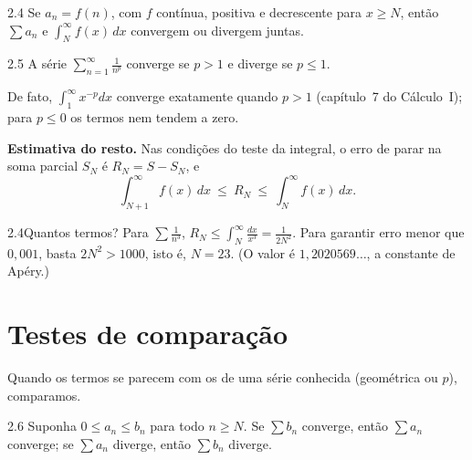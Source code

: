 \begin{teorema}{2.4}
Se $a_n=f(n)$, com $f$ contínua, positiva e decrescente para
$x\ge N$, então $\sum a_n$ e $\int_N^\infty f(x)\,dx$ convergem ou divergem juntas.
\end{teorema}


\begin{teorema}[Séries $p$]{2.5}
A série $\displaystyle\sum_{n=1}^\infty\frac1{n^p}$ converge se $p>1$ e diverge
se $p\le1$.
\end{teorema}
De fato, $\int_1^\infty x^{-p}dx$ converge exatamente quando $p>1$ (capítulo~7 do Cálculo~I);
para $p\le0$ os termos nem tendem a zero.

\textbf{Estimativa do resto.} Nas condições do teste da integral, o erro de parar na soma
parcial $S_N$ é $R_N=S-S_N$, e
\[
\int_{N+1}^\infty f(x)\,dx\ \le\ R_N\ \le\ \int_N^\infty f(x)\,dx .
\]

\begin{exemplo}{2.4}{Quantos termos?}
Para $\sum\frac1{n^3}$, $R_N\le\int_N^\infty\frac{dx}{x^3}=\frac1{2N^2}$. Para garantir erro
menor que $0{,}001$, basta $2N^2>1000$, isto é, $N=23$. (O valor é $1{,}2020569\dots$, a
constante de Apéry.)
\end{exemplo}

\section{Testes de comparação}

Quando os termos se parecem com os de uma série conhecida (geométrica ou $p$), comparamos.

\begin{teorema}{2.6}
Suponha $0\le a_n\le b_n$ para todo $n\ge N$. Se $\sum b_n$
converge, então $\sum a_n$ converge; se $\sum a_n$ diverge, então $\sum b_n$ diverge.
\end{teorema}

